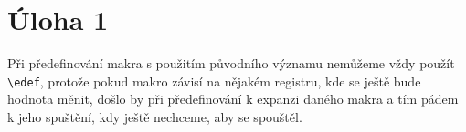 \documentclass{fkssolpub}
\author{Ondřej Sedláček}
\begin{document}
\section{Úloha 1}

Při předefinování makra s použitím původního významu nemůžeme vždy použít \verb|\edef|, protože pokud makro závisí na nějakém registru, kde se ještě bude hodnota měnit, došlo by při předefinování k expanzi daného makra a tím pádem k jeho spuštění, kdy ještě nechceme, aby se spouštěl.
\end{document}
